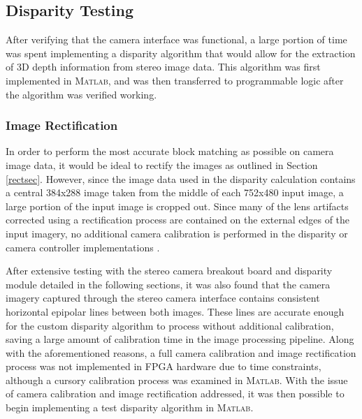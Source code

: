 \subsection{Disparity Testing}
After verifying that the camera interface was functional, a large portion of time was spent implementing a disparity algorithm that would allow for the extraction of 3D depth information from stereo image data. This algorithm was first implemented in \textsc{Matlab}, and was then transferred to programmable logic after the algorithm was verified working. 

\subsubsection{Image Rectification}
In order to perform the most accurate block matching as possible on camera image data, it would be ideal to rectify the images as outlined in Section \ref{rectsec}. However, since the image data used in the disparity calculation contains a central 384x288 image taken from the middle of each 752x480 input image, a large portion of the input image is cropped out. Since many of the lens artifacts corrected using a rectification process are contained on the external edges of the input imagery, no additional camera calibration is performed in the disparity or camera controller implementations \cite{collins}. 
\par
After extensive testing with the stereo camera breakout board and disparity module detailed in the following sections, it was also found that the camera imagery captured through the stereo camera interface contains consistent horizontal epipolar lines between both images. These lines are accurate enough for the custom disparity algorithm to process without additional calibration, saving a large amount of calibration time in the image processing pipeline. Along with the aforementioned reasons, a full camera calibration and image rectification process was not implemented in FPGA hardware due to time constraints, although a cursory calibration process was examined in \textsc{Matlab}. With the issue of camera calibration and image rectification addressed, it was then possible to begin implementing a test disparity algorithm in \textsc{Matlab}.

